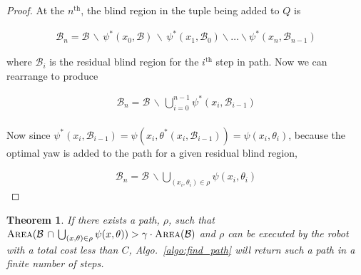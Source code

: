 \documentclass[letterpaper, 10pt, conference]{ieeeconf}
\newcommand{\Function}[1]{\ensuremath{{\textsc{#1}}}}
\newcommand{\B}[0]{\ensuremath{{{\mathcal{B}}}}}
\newtheorem{theorem}{Theorem}
\begin{document}
\begin{proof}

    At the $n^{\text{th}}$, the blind region in the tuple being added to $Q$ is

    \begin{align*}
        \B_n = \B \, \backslash \, \psi^*(x_0, \B) \, \backslash \,
        \psi^*(x_1, \B_0)
        \backslash \ldots \backslash \psi^*(x_n, \B_{n - 1})
    \end{align*}

    where $\B_i$ is the residual blind region for the $i^{\text{th}}$ step in
    path. Now we can rearrange to produce

    \begin{align*}
        \B_n = \B \, \backslash \, \bigcup_{i = 0}^{n - 1} 
        \psi^*(x_i, \B_{i - 1}) \\
    \end{align*}

    Now since $\psi^*(x_i, \B_{i - 1}) =
    \psi(x_i, \theta^*(x_i, \B_{i - 1})) = \psi(x_i, \theta_i)$, because
    the optimal yaw is added to the path for a given residual blind region,

    \begin{align*}
        \B_n = \B \, \backslash \bigcup_{(x_i, \theta_i) \in \rho}
        \psi(x_i, \theta_i)
    \end{align*}

\end{proof}

\begin{theorem}

    If there exists a path, $\rho$, such that $\Function{Area}(\mathcal{B}
    \, \cap \, \bigcup_{(x, \theta) \in \rho} \psi(x, \theta)) >  \gamma \cdot
    \Function{Area}(\mathcal{B})$ and $\rho$ can be executed by the
    robot with a total cost less than $C$, Algo.~\ref{algo:find_path} will
    return such a path in a finite number of steps.
    
\end{theorem}
\end{document}
